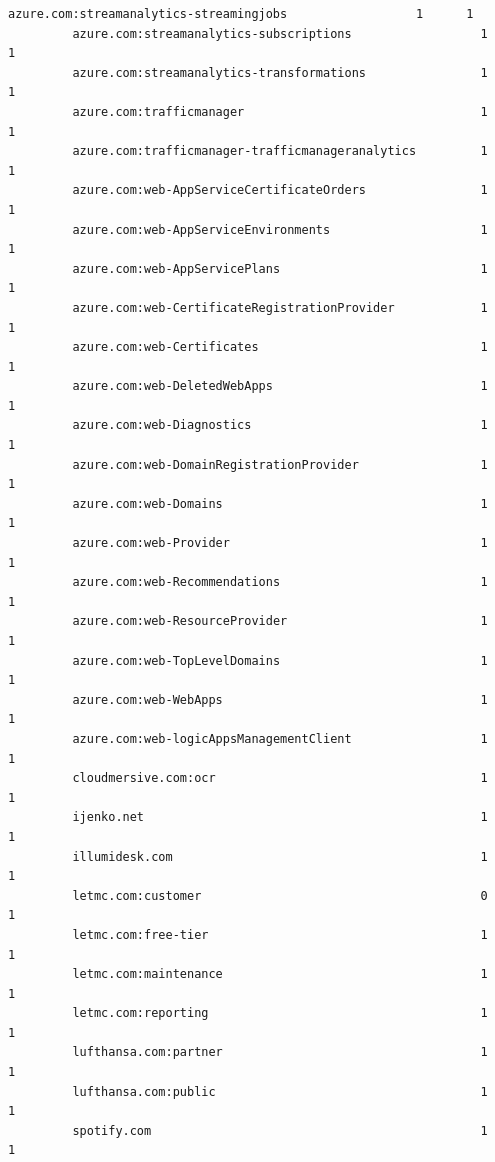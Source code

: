 \documentclass[11pt]{article}
\begin{document}
\begin{Verbatim}[commandchars=\\\{\}]
         azure.com:streamanalytics-streamingjobs                  1      1   
         azure.com:streamanalytics-subscriptions                  1      1   
         azure.com:streamanalytics-transformations                1      1   
         azure.com:trafficmanager                                 1      1   
         azure.com:trafficmanager-trafficmanageranalytics         1      1   
         azure.com:web-AppServiceCertificateOrders                1      1   
         azure.com:web-AppServiceEnvironments                     1      1   
         azure.com:web-AppServicePlans                            1      1   
         azure.com:web-CertificateRegistrationProvider            1      1   
         azure.com:web-Certificates                               1      1   
         azure.com:web-DeletedWebApps                             1      1   
         azure.com:web-Diagnostics                                1      1   
         azure.com:web-DomainRegistrationProvider                 1      1   
         azure.com:web-Domains                                    1      1   
         azure.com:web-Provider                                   1      1   
         azure.com:web-Recommendations                            1      1   
         azure.com:web-ResourceProvider                           1      1   
         azure.com:web-TopLevelDomains                            1      1   
         azure.com:web-WebApps                                    1      1   
         azure.com:web-logicAppsManagementClient                  1      1   
         cloudmersive.com:ocr                                     1      1   
         ijenko.net                                               1      1   
         illumidesk.com                                           1      1   
         letmc.com:customer                                       0      1   
         letmc.com:free-tier                                      1      1   
         letmc.com:maintenance                                    1      1   
         letmc.com:reporting                                      1      1   
         lufthansa.com:partner                                    1      1   
         lufthansa.com:public                                     1      1   
         spotify.com                                              1      1   
         

\end{Verbatim}
\end{document}
